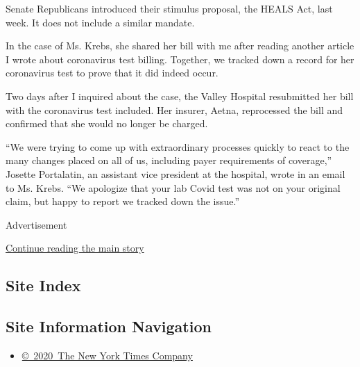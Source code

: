 Senate Republicans introduced their stimulus proposal, the HEALS Act,
last week. It does not include a similar mandate.

In the case of Ms. Krebs, she shared her bill with me after reading
another article I wrote about coronavirus test billing. Together, we
tracked down a record for her coronavirus test to prove that it did
indeed occur.

Two days after I inquired about the case, the Valley Hospital
resubmitted her bill with the coronavirus test included. Her insurer,
Aetna, reprocessed the bill and confirmed that she would no longer be
charged.

``We were trying to come up with extraordinary processes quickly to
react to the many changes placed on all of us, including payer
requirements of coverage,'' Josette Portalatin, an assistant vice
president at the hospital, wrote in an email to Ms. Krebs. ``We
apologize that your lab Covid test was not on your original claim, but
happy to report we tracked down the issue.''

Advertisement

\protect\hyperlink{after-bottom}{Continue reading the main story}

\hypertarget{site-index}{%
\subsection{Site Index}\label{site-index}}

\hypertarget{site-information-navigation}{%
\subsection{Site Information
Navigation}\label{site-information-navigation}}

\begin{itemize}
\tightlist
\item
  \href{https://help.nytimes.com/hc/en-us/articles/115014792127-Copyright-notice}{©~2020~The
  New York Times Company}
\end{itemize}

